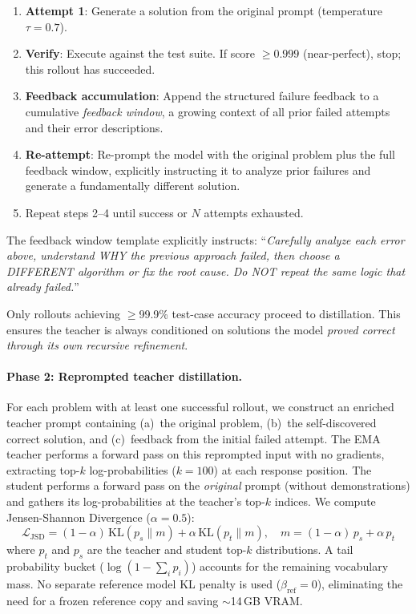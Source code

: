 \documentclass[11pt]{article}
\begin{document}
\begin{enumerate}[nosep]
    \item \textbf{Attempt 1}: Generate a solution from the original prompt (temperature $\tau = 0.7$).
    \item \textbf{Verify}: Execute against the test suite. If score $\geq 0.999$ (near-perfect), stop; this rollout has succeeded.
    \item \textbf{Feedback accumulation}: Append the structured failure feedback to a cumulative \emph{feedback window}, a growing context of all prior failed attempts and their error descriptions.
    \item \textbf{Re-attempt}: Re-prompt the model with the original problem plus the full feedback window, explicitly instructing it to analyze prior failures and generate a fundamentally different solution.
    \item Repeat steps 2--4 until success or $N$ attempts exhausted.
\end{enumerate}

The feedback window template explicitly instructs: ``\emph{Carefully analyze each error above, understand WHY the previous approach failed, then choose a DIFFERENT algorithm or fix the root cause. Do NOT repeat the same logic that already failed.}''

Only rollouts achieving $\geq$99.9\% test-case accuracy proceed to distillation. This ensures the teacher is always conditioned on solutions the model \emph{proved correct through its own recursive refinement}.

\paragraph{Phase 2: Reprompted teacher distillation.} For each problem with at least one successful rollout, we construct an enriched teacher prompt containing (a)~the original problem, (b)~the self-discovered correct solution, and (c)~feedback from the initial failed attempt. The EMA teacher performs a forward pass on this reprompted input with no gradients, extracting top-$k$ log-probabilities ($k = 100$) at each response position. The student performs a forward pass on the \emph{original} prompt (without demonstrations) and gathers its log-probabilities at the teacher's top-$k$ indices. We compute Jensen-Shannon Divergence ($\alpha = 0.5$):
\begin{equation}
    \mathcal{L}_{\text{JSD}} = (1 - \alpha) \, \text{KL}(p_s \| m) + \alpha \, \text{KL}(p_t \| m), \quad m = (1-\alpha) \, p_s + \alpha \, p_t
\end{equation}
where $p_t$ and $p_s$ are the teacher and student top-$k$ distributions. A tail probability bucket ($\log(1 - \sum_i p_i)$) accounts for the remaining vocabulary mass. No separate reference model KL penalty is used ($\beta_{\text{ref}} = 0$), eliminating the need for a frozen reference copy and saving ${\sim}$14\,GB VRAM.
\end{document}

